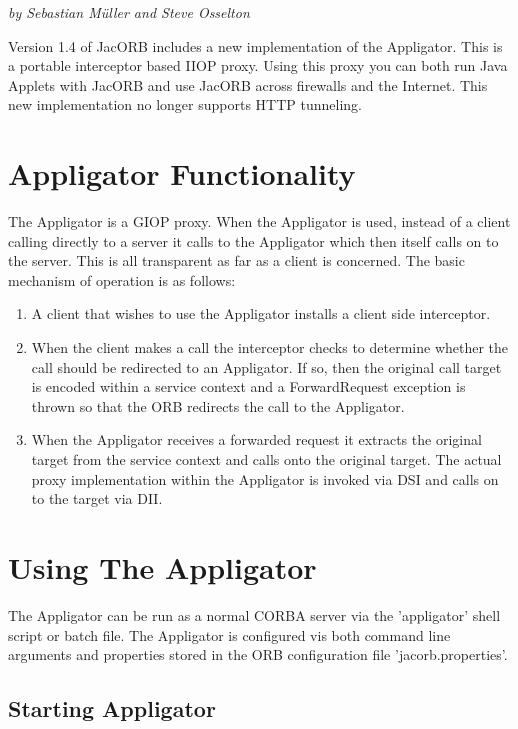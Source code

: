 
{\em by Sebastian M{\"u}ller and Steve Osselton}

\bigskip

Version 1.4 of JacORB includes a new implementation of the Appligator.
This is a portable interceptor based IIOP proxy.  Using this proxy you
can both run Java Applets with JacORB and use JacORB across firewalls
and the Internet. This new implementation no longer supports HTTP
tunneling.

\section{Appligator Functionality}

The Appligator is a GIOP proxy. When the Appligator is used, instead
of a client calling directly to a server it calls to the Appligator
which then itself calls on to the server. This is all transparent as
far as a client is concerned.  The basic mechanism of operation is as
follows:

\begin{enumerate}
\item A client that wishes to use the Appligator installs a client
  side interceptor.
\item When the client makes a call the interceptor checks to determine
  whether the call should be redirected to an Appligator. If so, then
  the original call target is encoded within a service context and a
  ForwardRequest exception is thrown so that the ORB redirects the
  call to the Appligator.
\item When the Appligator receives a forwarded request it extracts the
  original target from the service context and calls onto the original
  target. The actual proxy implementation within the Appligator is
  invoked via DSI and calls on to the target via DII.
\end{enumerate}

\section{Using The Appligator}

The Appligator can be run as a normal CORBA server via the
'appligator' shell script or batch file. The Appligator is configured
vis both command line arguments and properties stored in the ORB
configuration file 'jacorb.properties'.

\subsection{Starting Appligator}


